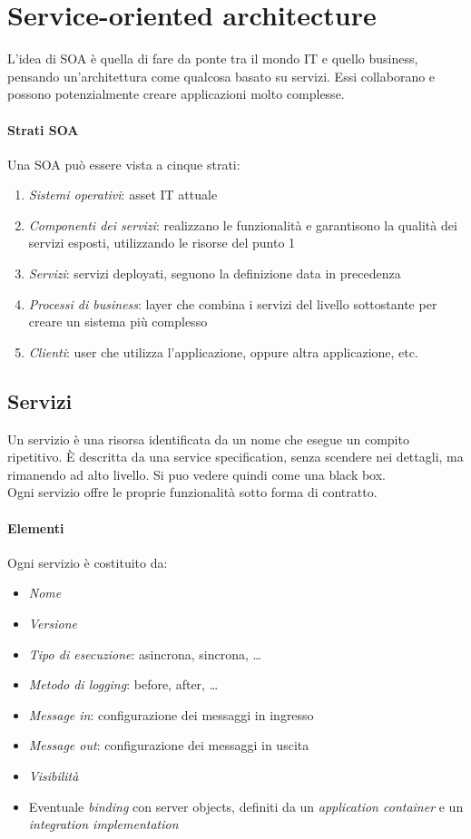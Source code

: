 \section{Service-oriented architecture}
L'idea di SOA è quella di fare da ponte tra il mondo IT e quello business, 
pensando un'architettura come qualcosa basato su servizi.
Essi collaborano e possono potenzialmente creare applicazioni molto complesse.

\paragraph{Strati SOA}
Una SOA può essere vista a cinque strati:
\begin{enumerate}
    \item \emph{Sistemi operativi}: asset IT attuale
    \item \emph{Componenti dei servizi}: realizzano le funzionalità e garantisono la qualità
    dei servizi esposti, utilizzando le risorse del punto 1
    \item \emph{Servizi}: servizi deployati, 
    seguono la definizione data in precedenza
    \item \emph{Processi di business}: layer che combina i servizi del livello sottostante
    per creare un sistema più complesso
    \item \emph{Clienti}: user che utilizza l'applicazione, oppure altra applicazione, etc. 
\end{enumerate}

\subsection{Servizi}
Un servizio è una risorsa identificata da un nome che esegue un compito ripetitivo.
È descritta da una service specification, senza scendere nei dettagli, ma rimanendo 
ad alto livello. Si puo vedere quindi come una black box.\\
Ogni servizio offre le proprie funzionalità sotto forma di contratto.
\paragraph{Elementi}
Ogni servizio è costituito da:
\begin{itemize}
    \item \emph{Nome}
    \item \emph{Versione}
    \item \emph{Tipo di esecuzione}: asincrona, sincrona, \dots
    \item \emph{Metodo di logging}: before, after, \dots
    \item \emph{Message in}: configurazione dei messaggi in ingresso
    \item \emph{Message out}: configurazione dei messaggi in uscita
    \item \emph{Visibilità}
    \item Eventuale \emph{binding} con server objects, definiti da un \emph{application 
    container} e un \emph{integration implementation}
\end{itemize}

